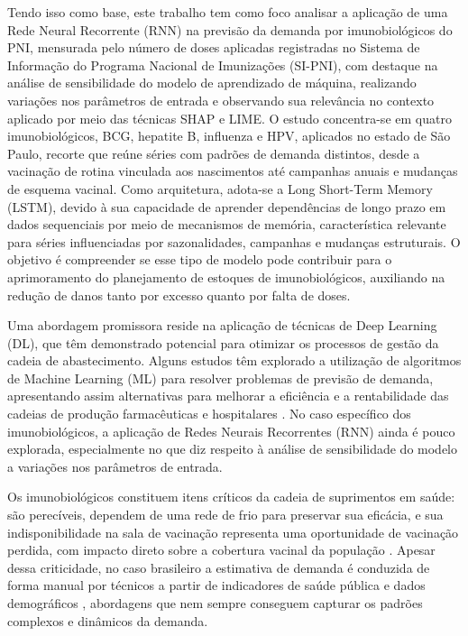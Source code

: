 \documentclass[
    12pt,
    openright,
    oneside,
    a4paper,
    english,
    brazil
]{abntex2}
\begin{document}
Tendo isso como base, este trabalho tem como foco analisar a aplicação de uma Rede Neural Recorrente (RNN) na previsão da demanda por imunobiológicos do PNI, mensurada pelo número de doses aplicadas registradas no Sistema de Informação do Programa Nacional de Imunizações (SI-PNI), com destaque na análise de sensibilidade do modelo de aprendizado de máquina, realizando variações nos parâmetros de entrada e observando sua relevância no contexto aplicado por meio das técnicas SHAP e LIME. O estudo concentra-se em quatro imunobiológicos, BCG, hepatite B, influenza e HPV, aplicados no estado de São Paulo, recorte que reúne séries com padrões de demanda distintos, desde a vacinação de rotina vinculada aos nascimentos até campanhas anuais e mudanças de esquema vacinal. Como arquitetura, adota-se a Long Short-Term Memory (LSTM), devido à sua capacidade de aprender dependências de longo prazo em dados sequenciais por meio de mecanismos de memória, característica relevante para séries influenciadas por sazonalidades, campanhas e mudanças estruturais. O objetivo é compreender se esse tipo de modelo pode contribuir para o aprimoramento do planejamento de estoques de imunobiológicos, auxiliando na redução de danos tanto por excesso quanto por falta de doses.

Uma abordagem promissora reside na aplicação de técnicas de Deep Learning (DL), que têm demonstrado potencial para otimizar os processos de gestão da cadeia de abastecimento. Alguns estudos têm explorado a utilização de algoritmos de Machine Learning (ML) para resolver problemas de previsão de demanda, apresentando assim alternativas para melhorar a eficiência e a rentabilidade das cadeias de produção farmacêuticas e hospitalares . No caso específico dos imunobiológicos, a aplicação de Redes Neurais Recorrentes (RNN) ainda é pouco explorada, especialmente no que diz respeito à análise de sensibilidade do modelo a variações nos parâmetros de entrada.

Os imunobiológicos constituem itens críticos da cadeia de suprimentos em saúde: são perecíveis, dependem de uma rede de frio para preservar sua eficácia, e sua indisponibilidade na sala de vacinação representa uma oportunidade de vacinação perdida, com impacto direto sobre a cobertura vacinal da população \cite{Lopes2022}. Apesar dessa criticidade, no caso brasileiro a estimativa de demanda é conduzida de forma manual por técnicos a partir de indicadores de saúde pública e dados demográficos \cite{Lopes2022}, abordagens que nem sempre conseguem capturar os padrões complexos e dinâmicos da demanda.
\end{document}
